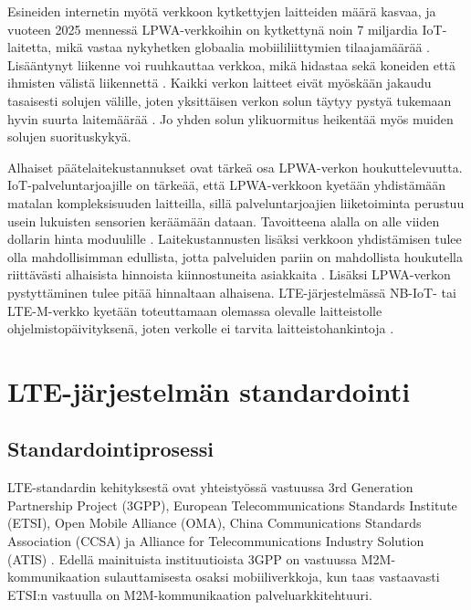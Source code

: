 \documentclass[finnish, 12pt, a4paper, elec, latin1, utf8, online]{aaltothesis}
\begin{document}
Esineiden internetin myötä verkkoon kytkettyjen laitteiden määrä kasvaa, ja vuoteen 2025 mennessä LPWA-verkkoihin on kytkettynä noin 7 miljardia IoT-laitetta, mikä vastaa nykyhetken globaalia mobiililiittymien tilaajamäärää \cite{nokiawhitepaper}. Lisääntynyt liikenne voi ruuhkauttaa verkkoa, mikä hidastaa sekä koneiden että ihmisten välistä liikennettä \cite{diaz20163gpp}. Kaikki verkon laitteet eivät myöskään jakaudu tasaisesti solujen välille, joten yksittäisen verkon solun täytyy pystyä tukemaan hyvin suurta laitemäärää \cite{nokiawhitepaper}. Jo yhden solun ylikuormitus heikentää myös muiden solujen suorituskykyä.

Alhaiset päätelaitekustannukset ovat tärkeä osa LPWA-verkon houkuttelevuutta. IoT-palveluntarjoajille on tärkeää, että LPWA-verkkoon kyetään yhdistämään matalan kompleksisuuden laitteilla, sillä palveluntarjoajien liiketoiminta perustuu usein lukuisten sensorien keräämään dataan. Tavoitteena alalla on alle viiden dollarin hinta moduulille \cite{nokiawhitepaper}. Laitekustannusten lisäksi verkkoon yhdistämisen tulee olla mahdollisimman edullista, jotta palveluiden pariin on mahdollista houkutella riittävästi alhaisista hinnoista kiinnostuneita asiakkaita \cite{harmaala}. Lisäksi LPWA-verkon pystyttäminen tulee pitää hinnaltaan alhaisena. LTE-järjestelmässä NB-IoT- tai LTE-M-verkko kyetään toteuttamaan olemassa olevalle laitteistolle ohjelmistopäivityksenä, joten verkolle ei tarvita laitteistohankintoja \cite{nokiawhitepaper}.

\clearpage
\section{LTE-järjestelmän standardointi}

\subsection{Standardointiprosessi}

LTE-standardin kehityksestä ovat yhteistyössä vastuussa 3rd Generation Partnership Project (3GPP), European Telecommunications Standards Institute (ETSI), Open Mobile Alliance (OMA), China Communications Standards Association (CCSA) ja Alliance for Telecommunications Industry Solution (ATIS) \cite{ghavimi2015m2m}. Edellä mainituista instituutioista 3GPP on vastuussa M2M-kommunikaation sulauttamisesta osaksi mobiiliverkkoja, kun taas vastaavasti ETSI:n vastuulla on M2M-kommunikaation palveluarkkitehtuuri. 
\end{document}
